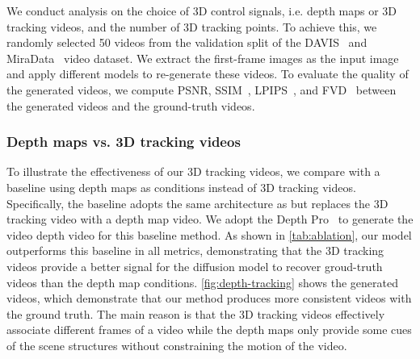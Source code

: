 We conduct analysis on the choice of 3D control signals, i.e. depth maps or 3D tracking videos, and the number of 3D tracking points.
To achieve this, we randomly selected 50 videos from the validation split of the DAVIS~\cite{Pont-Tuset_arXiv_2017} and MiraData~\cite{ju2024miradatalargescalevideodataset} video dataset. We extract the first-frame images as the input image and apply different models to re-generate these videos.
To evaluate the quality of the generated videos, we compute PSNR, SSIM~\cite{1284395}, LPIPS~\cite{zhang2018unreasonableeffectivenessdeepfeatures}, and FVD~\cite{unterthiner2019accurategenerativemodelsvideo} between the generated videos and the ground-truth videos.

\subsubsection{Depth maps vs. 3D tracking videos}

To illustrate the effectiveness of our 3D tracking videos, we compare \methodname with a baseline using depth maps as conditions instead of 3D tracking videos. Specifically, the baseline adopts the same architecture as \methodname but replaces the 3D tracking video with a depth map video. We adopt the Depth Pro~\cite{bochkovskii2024depth} to generate the video depth video for this baseline method. As shown in \autoref{tab:ablation}, our model outperforms this baseline in all metrics, demonstrating that the 3D tracking videos provide a better signal for the diffusion model to recover groud-truth videos than the depth map conditions. \autoref{fig:depth-tracking} shows the generated videos, which demonstrate that our method produces more consistent videos with the ground truth. The main reason is that the 3D tracking videos effectively associate different frames of a video while the depth maps only provide some cues of the scene structures without constraining the motion of the video.

